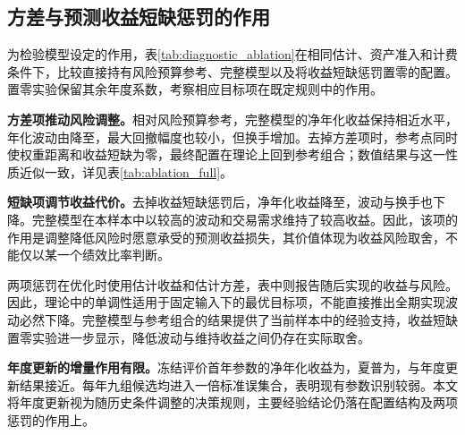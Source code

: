 \subsection{方差与预测收益短缺惩罚的作用}
\label{sec:ablation_results}
为检验模型设定的作用，表\ref{tab:diagnostic_ablation}在相同估计、资产准入和计费条件下，比较直接持有风险预算参考、完整模型以及将收益短缺惩罚置零的配置。置零实验保留其余年度系数，考察相应目标项在既定规则中的作用。
\begin{table}[htbp]\centering
\caption{两项惩罚的核心消融比较}\label{tab:diagnostic_ablation}
\end{table}

\textbf{方差项推动风险调整。}相对风险预算参考，完整模型的净年化收益保持相近水平，年化波动由\diagReferenceVol{}降至\globalVolatility，最大回撤幅度也较小，但换手增加。去掉方差项时，参考点同时使权重距离和收益短缺为零，最终配置在理论上回到参考组合；数值结果与这一性质近似一致，详见表\ref{tab:ablation_full}。

\textbf{短缺项调节收益代价。}去掉收益短缺惩罚后，净年化收益降至\diagNoShortfallReturn，波动与换手也下降。完整模型在本样本中以较高的波动和交易需求维持了较高收益。因此，该项的作用是调整降低风险时愿意承受的预测收益损失，其价值体现为收益风险取舍，不能仅以某一个绩效比率判断。

两项惩罚在优化时使用估计收益和估计方差，表中则报告随后实现的收益与风险。因此，理论中的单调性适用于固定输入下的最优目标项，不能直接推出全期实现波动必然下降。完整模型与参考组合的结果提供了当前样本中的经验支持，收益短缺置零实验进一步显示，降低波动与维持收益之间仍存在实际取舍。

\textbf{年度更新的增量作用有限。}冻结评价首年参数的净年化收益为\diagFrozenReturn，夏普为\diagFrozenSharpe，与年度更新结果接近。每年九组候选均进入一倍标准误集合，表明现有参数识别较弱。本文将年度更新视为随历史条件调整的决策规则，主要经验结论仍落在配置结构及两项惩罚的作用上。
\FloatBarrier
